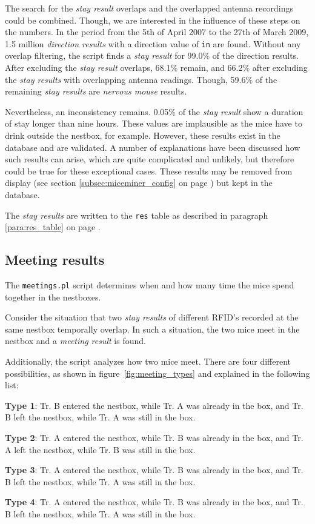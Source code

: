 The search for the \textit{stay result} overlaps and the overlapped antenna recordings could be combined. Though, we are interested in the influence of these steps on the numbers. In the period from the 5th of April 2007 to the 27th of March 2009, 1.5 million \textit{direction results} with a direction value of \lstinline|in| are found. Without any overlap filtering, the script finds a \textit{stay result} for 99.0\% of the direction results. After excluding the \textit{stay result} overlaps, 68.1\% remain, and 66.2\% after excluding the \textit{stay results} with overlapping antenna readings. Though, 59.6\% of the remaining \textit{stay results} are \textit{nervous mouse} results.

Nevertheless, an inconsistency remains. 0.05\% of the \textit{stay result} show a duration of stay longer than nine hours. These values are implausible as the mice have to drink outside the nestbox, for example. However, these results exist in the database and are validated. A number of explanations have been discussed how such results can arise, which are quite complicated and unlikely, but therefore could be true for these exceptional cases. These results may be removed from display (see section \ref{subsec:miceminer_config} on page \pageref{subsec:miceminer_config}) but kept in the database.     

The \textit{stay results} are written to the \lstinline|res| table as described in paragraph \ref{para:res_table} on page \pageref{para:res_table}.

\subsection{Meeting results}
\label{subsec:meetingres}

The \lstinline|meetings.pl| script determines when and how many time the mice spend together in the nestboxes. 

Consider the situation that two \textit{stay results} of different RFID's recorded at the same nestbox temporally overlap. In such a situation, the two mice meet in the nestbox and a \textit{meeting result} is found.

Additionally, the script analyzes how two mice meet. There are four different possibilities, as shown in figure~\ref{fig:meeting_types} and explained in the following list:

\begin{mydesc}
\label{list:meeting_types}
\item \textbf{Type 1}: Tr. B entered the nestbox, while Tr. A was already in the box, and Tr. B left the nestbox, while Tr. A was still in the box. 
\item \textbf{Type 2}: Tr. A entered the nestbox, while Tr. B was already in the box, and Tr. A left the nestbox, while Tr. B was still in the box. 
\item \textbf{Type 3}: Tr. A entered the nestbox, while Tr. B was already in the box, and Tr. B left the nestbox, while Tr. A was still in the box. 
\item \textbf{Type 4}: Tr. A entered the nestbox, while Tr. B was already in the box, and Tr. B left the nestbox, while Tr. A was still in the box. 
\end{mydesc}

